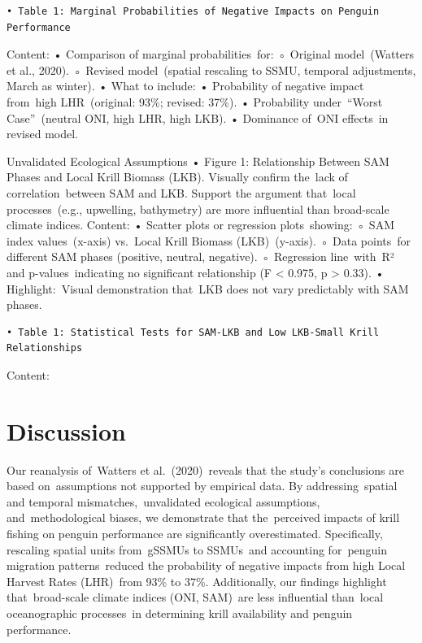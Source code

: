 \documentclass[]{elsarticle} %
\begin{document}
\begin{verbatim}
• Table 1: Marginal Probabilities of Negative Impacts on Penguin Performance
\end{verbatim}

Content: • Comparison of marginal probabilities~for: ◦ Original
model~(Watters et al., 2020). ◦ Revised model~(spatial rescaling to
SSMU, temporal adjustments, March as winter). • What to include: •
Probability of negative impact from~high LHR~(original: 93\%; revised:
37\%). • Probability under~``Worst Case''~(neutral ONI, high LHR, high
LKB). • Dominance of~ONI effects~in revised model.

Unvalidated Ecological Assumptions • Figure 1: Relationship Between SAM
Phases and Local Krill Biomass (LKB). Visually confirm the~lack of
correlation~between SAM and LKB. Support the argument that~local
processes~(e.g., upwelling, bathymetry) are more influential than
broad-scale climate indices. Content: • Scatter plots or regression
plots~showing: ◦ SAM index values~(x-axis) vs.~Local Krill Biomass
(LKB)~(y-axis). ◦ Data points~for different SAM phases (positive,
neutral, negative). ◦ Regression line~with~R² and p-values~indicating no
significant relationship (F \textless{} 0.975, p \textgreater{} 0.33). •
Highlight:~Visual demonstration that~LKB does not vary predictably with
SAM phases.

\begin{verbatim}
• Table 1: Statistical Tests for SAM-LKB and Low LKB-Small Krill Relationships
\end{verbatim}

Content:

\section{Discussion}\label{discussion}

Our reanalysis of~Watters et al.~(2020)~reveals that the study's
conclusions are based on~assumptions not supported by empirical data. By
addressing~spatial and temporal mismatches,~unvalidated ecological
assumptions, and~methodological biases, we demonstrate that
the~perceived impacts of krill fishing on penguin performance are
significantly overestimated. Specifically, rescaling spatial units
from~gSSMUs to SSMUs~and accounting for~penguin migration
patterns~reduced the probability of negative impacts from high Local
Harvest Rates (LHR)~from 93\% to 37\%. Additionally, our findings
highlight that~broad-scale climate indices (ONI, SAM)~are less
influential than~local oceanographic processes~in determining krill
availability and penguin performance.
\end{document}
